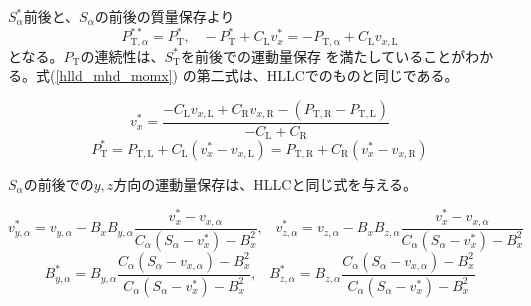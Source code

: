 $S^*_\alpha$前後と、$S_\alpha$の前後の質量保存より
\begin{equation}
 P^{**}_{\mathrm{T},\alpha} = P^*_\mathrm{T}, \;\;\;
 -P^*_\mathrm{T} + C_\mathrm{L} v_x^*  = 
 - P_\mathrm{T,\alpha} + C_\mathrm{L} v_{x,\mathrm{L}}
 \label{hlld_mhd_momx}
\end{equation}
となる。$P_\mathrm{T}$の連続性は、$S^*_\mathrm{T}$を前後での運動量保存
を満たしていることがわかる。式(\ref{hlld_mhd_momx})
の第二式は、HLLCでのものと同じである。
\begin{screen}
\begin{equation}
    v_x^* = \frac{ - C_\mathrm{L} v_{x,\mathrm{L}} + C_\mathrm{R} v_{x,\mathrm{R}}
    - (P_\mathrm{T,R} - P_\mathrm{T,L})}{-C_\mathrm{L} + C_\mathrm{R}} 
\end{equation}
\begin{equation}
    P_\mathrm{T}^* = P_\mathrm{T,L} + C_\mathrm{L} (v^*_x - v_{x,\mathrm{L}})
        = P_\mathrm{T,R} + C_\mathrm{R} (v^*_x - v_{x,\mathrm{R}})
\end{equation}
\end{screen}

$S_\alpha$の前後での$y,z$方向の運動量保存は、HLLCと同じ式を与える。
\begin{screen}
\begin{equation}
v_{y,\alpha}^* = v_{y,\alpha}
- B_x B_{y,\alpha} \frac{ v_{x}^* - v_{x,\alpha} } {
C_\alpha (S_\alpha - v_x^*) - B_x^2
},\;\;\;
v_{z,\alpha}^* = v_{z,\alpha}
- B_x B_{z,\alpha} \frac{ v_{x}^* - v_{x,\alpha} } {
C_\alpha (S_\alpha - v_x^*) - B_x^2
}
\end{equation}
\begin{equation}
B_{y,\alpha}^* = B_{y,\alpha}
\frac{ C_\alpha(S_\alpha - v_{x,\alpha}) - B_x^2  } 
{C_\alpha (S_\alpha - v_x^*) - B_x^2},\;\;\;
B_{z,\alpha}^* = B_{z,\alpha}
\frac{ C_\alpha(S_\alpha - v_{x,\alpha}) - B_x^2  } {
C_\alpha (S_\alpha - v_x^*) - B_x^2
}
\end{equation}
\end{screen}



